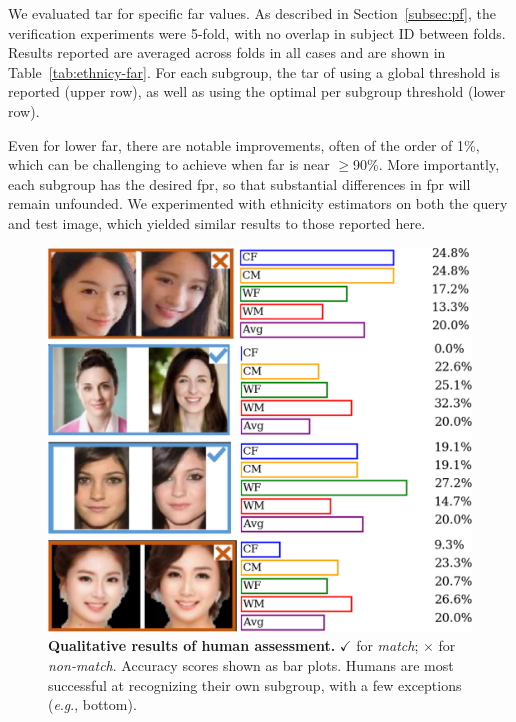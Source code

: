 \documentclass[10pt,twocolumn,letterpaper]{article}
\newcommand{\eg}{\textit{e}.\textit{g}., }
\begin{document}
We evaluated \gls{tar} for specific \gls{far} values. As described in Section~\ref{subsec:pf}, the verification experiments were 5-fold, with no overlap in subject ID between folds. Results reported are averaged across folds in all cases and are shown in Table~\ref{tab:ethnicy-far}. For each subgroup, the \gls{tar} of using a global threshold is reported (upper row), as well as using the optimal per subgroup threshold (lower row). 

Even for lower \gls{far}, there are notable improvements, often of the order of 1\%, which can be challenging to achieve when \gls{far} is near $\geq$90\%. More importantly, each subgroup has the desired \gls{fpr}, so that substantial differences in \gls{fpr} will remain unfounded. We experimented with ethnicity estimators on both the query and test image, which yielded similar results to those reported here.

\begin{figure}[t!] 
	\centering    
	\includegraphics[width=.85\linewidth] {figures/human_eval.pdf}
		\caption{\small{\textbf{Qualitative results of human assessment.} $\checkmark$ for \emph{match}; $\times$ for \emph{non-match}. Accuracy scores shown as bar plots. Humans are most successful at recognizing their own subgroup, with a few exceptions (\eg bottom).}}
		\label{fig:human-eval} 
\end{figure} 
\end{document}
